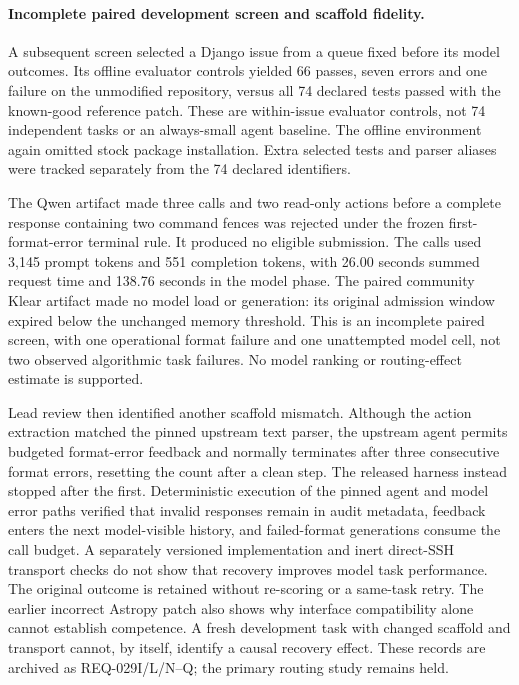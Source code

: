 \paragraph{Incomplete paired development screen and scaffold fidelity.}
A subsequent screen selected a Django issue from a queue fixed before its model outcomes.
Its offline evaluator controls yielded 66 passes, seven errors and one failure on the unmodified
repository, versus all 74 declared tests passed with the known-good reference patch. These are
within-issue evaluator controls, not 74 independent tasks or an always-small agent baseline.
The offline environment again omitted stock package installation. Extra selected tests and
parser aliases were tracked separately from the 74 declared identifiers.

The Qwen artifact made three calls and two read-only actions before a complete response containing
two command fences was rejected under the frozen first-format-error terminal rule. It produced
no eligible submission. The calls used 3,145 prompt tokens and 551 completion tokens, with 26.00
seconds summed request time and 138.76 seconds in the model phase. The paired community Klear
artifact made no model load or generation: its original admission window expired below the
unchanged memory threshold. This is an incomplete paired screen, with one operational format
failure and one unattempted model cell, not two observed algorithmic task failures. No model
ranking or routing-effect estimate is supported.

Lead review then identified another scaffold mismatch. Although the action extraction matched the
pinned upstream text parser, the upstream agent permits budgeted format-error feedback and normally
terminates after three consecutive format errors, resetting the count after a clean step. The
released harness instead stopped after the first. Deterministic execution of the pinned agent and
model error paths verified that invalid responses remain in audit metadata, feedback enters the next
model-visible history, and failed-format generations consume the call budget. A separately versioned
implementation and inert direct-SSH transport checks do not show that recovery improves model task
performance. The original outcome is retained without re-scoring or a same-task retry. The earlier
incorrect Astropy patch also shows why interface compatibility alone cannot establish competence.
A fresh development task with changed scaffold and transport cannot, by itself, identify a causal
recovery effect. These records are archived as REQ-029I/L/N--Q; the primary routing study remains held.

